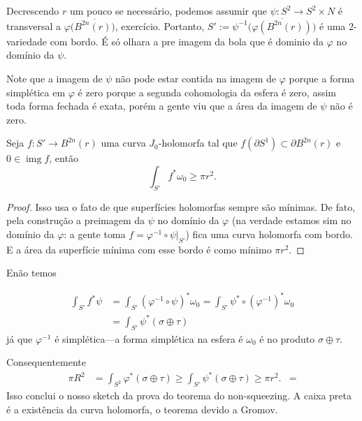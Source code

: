 Decrescendo $r$ um pouco se necessário, podemos assumir que $\psi:S^2 \to S^2\times N$ é transversal a $\varphi(\overline{B^{2n}(r))}$, exercício. Portanto, $S':=\psi^{-1}\Big(\overline{\varphi(B^{2n}(r))}\Big)$ é uma 2-variedade com bordo. {\color{3}É só olhara a pre imagem da bola que é dominio da $\varphi$ no domínio da $\psi$.}

\begin{remark}\leavevmode
	Note que a imagem de $\psi$ não pode estar contida na imagem de $\varphi$ porque a forma simplética em $\varphi$ é zero porque a segunda cohomologia da esfera é zero, assim toda forma fechada é exata, porém a gente viu que a área da imagem de  $\psi$ não é zero.
\end{remark}

\begin{lemma}[de monotonicidade]\leavevmode
Seja $f: S' \to B^{2n}(r)$ uma curva $J_0$-holomorfa tal que $f(\partial S^1)\subset \partial B^{2n}(r)$ e $0 \in \operatorname{img} f$, então
\[\int_{S'}f^*\omega_0\geq \pi r^2.\]
\end{lemma}

\begin{proof}\leavevmode
Isso usa o fato de que superfícies holomorfas sempre são mínimas. De fato, pela construção a preimagem da $\psi$ no domínio da $\varphi$ (na verdade estamos sim no domínio da $\varphi$: a gente toma $f=\varphi^{-1}\circ\psi|_{S'}$) fica uma curva holomorfa com bordo. E a área da superfície mínima com esse bordo é como mínimo $\pi r^2$.
\end{proof}

Enão temos

\begin{align*}
\int_{S'}f^*\psi&=\int_{S'}(\varphi^{-1} \circ \psi)^*  \omega_0=\int_{S'}\psi^*\circ(\varphi^{-1})^*\omega_0\\
&=\int_{S'}\psi^*(\sigma  \oplus \tau)
\end{align*}
já que $\varphi^{-1}$ é simplética---a forma simplética na esfera é $\omega_0$ é no produto $\sigma \oplus  \tau$.

Consequentemente
 \begin{align*}
	 \pi R^2&=\int_{S^2}\varphi^* (\sigma \oplus  \tau) \geq \int_{S'}\psi^*(\sigma \oplus  \tau) \geq \pi r^2.
	 &=
\end{align*}
Isso conclui o nosso sketch da prova do teorema do non-squeezing. A caixa preta é a existência da curva holomorfa, o teorema devido a Gromov.


